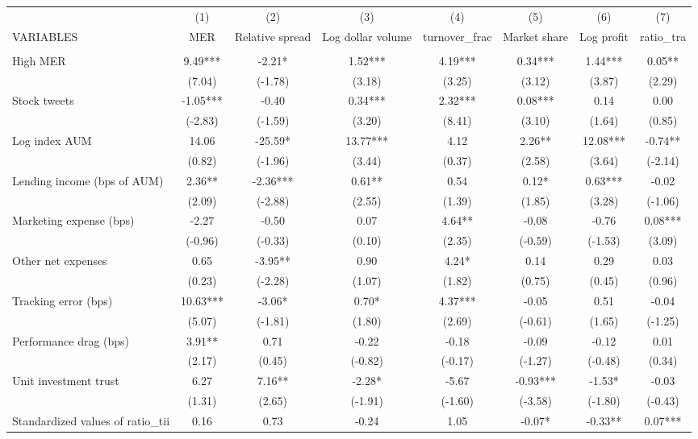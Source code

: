 \documentclass[]{article}
\begin{document}
\begin{tabular}{lccccccc} \hline
 & (1) & (2) & (3) & (4) & (5) & (6) & (7) \\
VARIABLES & MER & Relative spread & Log dollar volume & turnover\_frac & Market share & Log profit & ratio\_tra \\ \hline
 &  &  &  &  &  &  &  \\
High MER & 9.49*** & -2.21* & 1.52*** & 4.19*** & 0.34*** & 1.44*** & 0.05** \\
 & (7.04) & (-1.78) & (3.18) & (3.25) & (3.12) & (3.87) & (2.29) \\
Stock tweets & -1.05*** & -0.40 & 0.34*** & 2.32*** & 0.08*** & 0.14 & 0.00 \\
 & (-2.83) & (-1.59) & (3.20) & (8.41) & (3.10) & (1.64) & (0.85) \\
Log index AUM & 14.06 & -25.59* & 13.77*** & 4.12 & 2.26** & 12.08*** & -0.74** \\
 & (0.82) & (-1.96) & (3.44) & (0.37) & (2.58) & (3.64) & (-2.14) \\
Lending income (bps of AUM) & 2.36** & -2.36*** & 0.61** & 0.54 & 0.12* & 0.63*** & -0.02 \\
 & (2.09) & (-2.88) & (2.55) & (1.39) & (1.85) & (3.28) & (-1.06) \\
Marketing expense (bps) & -2.27 & -0.50 & 0.07 & 4.64** & -0.08 & -0.76 & 0.08*** \\
 & (-0.96) & (-0.33) & (0.10) & (2.35) & (-0.59) & (-1.53) & (3.09) \\
Other net expenses & 0.65 & -3.95** & 0.90 & 4.24* & 0.14 & 0.29 & 0.03 \\
 & (0.23) & (-2.28) & (1.07) & (1.82) & (0.75) & (0.45) & (0.96) \\
Tracking error (bps) & 10.63*** & -3.06* & 0.70* & 4.37*** & -0.05 & 0.51 & -0.04 \\
 & (5.07) & (-1.81) & (1.80) & (2.69) & (-0.61) & (1.65) & (-1.25) \\
Performance drag (bps) & 3.91** & 0.71 & -0.22 & -0.18 & -0.09 & -0.12 & 0.01 \\
 & (2.17) & (0.45) & (-0.82) & (-0.17) & (-1.27) & (-0.48) & (0.34) \\
Unit investment trust & 6.27 & 7.16** & -2.28* & -5.67 & -0.93*** & -1.53* & -0.03 \\
 & (1.31) & (2.65) & (-1.91) & (-1.60) & (-3.58) & (-1.80) & (-0.43) \\
Standardized values of ratio\_tii & 0.16 & 0.73 & -0.24 & 1.05 & -0.07* & -0.33** & 0.07*** \\

\end{tabular}
\end{document}
